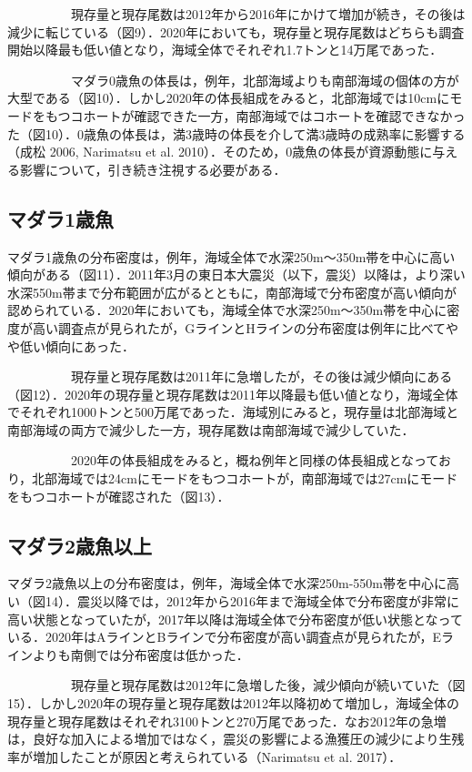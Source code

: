 \documentclass[11pt]{article} %
\begin{document}
\begin{linenumbers}
\ \ \ \ \ \ \ \ \ \ 
現存量と現存尾数は2012年から2016年にかけて増加が続き，その後は減少に転じている（図9）．2020年においても，現存量と現存尾数はどちらも調査開始以降最も低い値となり，海域全体でそれぞれ1.7トンと14万尾であった．

\ \ \ \ \ \ \ \ \ \ 
マダラ0歳魚の体長は，例年，北部海域よりも南部海域の個体の方が大型である（図10）．しかし2020年の体長組成をみると，北部海域では10cmにモードをもつコホートが確認できた一方，南部海域ではコホートを確認できなかった（図10）．0歳魚の体長は，満3歳時の体長を介して満3歳時の成熟率に影響する（成松 2006, Narimatsu et al. 2010）．そのため，0歳魚の体長が資源動態に与える影響について，引き続き注視する必要がある．


\subsection{マダラ1歳魚}
マダラ1歳魚の分布密度は，例年，海域全体で水深250m～350m帯を中心に高い傾向がある（図11）．2011年3月の東日本大震災（以下，震災）以降は，より深い水深550m帯まで分布範囲が広がるとともに，南部海域で分布密度が高い傾向が認められている．2020年においても，海域全体で水深250m～350m帯を中心に密度が高い調査点が見られたが，GラインとHラインの分布密度は例年に比べてやや低い傾向にあった．

\ \ \ \ \ \ \ \ \ \ 
現存量と現存尾数は2011年に急増したが，その後は減少傾向にある（図12）．2020年の現存量と現存尾数は2011年以降最も低い値となり，海域全体でそれぞれ1000トンと500万尾であった．海域別にみると，現存量は北部海域と南部海域の両方で減少した一方，現存尾数は南部海域で減少していた．

\ \ \ \ \ \ \ \ \ \ 
2020年の体長組成をみると，概ね例年と同様の体長組成となっており，北部海域では24cmにモードをもつコホートが，南部海域では27cmにモードをもつコホートが確認された（図13）．


\subsection{マダラ2歳魚以上}
マダラ2歳魚以上の分布密度は，例年，海域全体で水深250m-550m帯を中心に高い（図14）．震災以降では，2012年から2016年まで海域全体で分布密度が非常に高い状態となっていたが，2017年以降は海域全体で分布密度が低い状態となっている．2020年はAラインとBラインで分布密度が高い調査点が見られたが，Eラインよりも南側では分布密度は低かった．

\ \ \ \ \ \ \ \ \ \ 
現存量と現存尾数は2012年に急増した後，減少傾向が続いていた（図15）．しかし2020年の現存量と現存尾数は2012年以降初めて増加し，海域全体の現存量と現存尾数はそれぞれ3100トンと270万尾であった．なお2012年の急増は，良好な加入による増加ではなく，震災の影響による漁獲圧の減少により生残率が増加したことが原因と考えられている（Narimatsu et al. 2017）．


\end{linenumbers}
\end{document}
